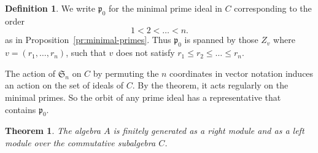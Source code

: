 \documentclass[12pt]{amsart}
\renewcommand{\le}{\leqslant}
\newcommand{\sym}[1]{\mathfrak{S}_{#1}}
\newcommand{\mfp}{\mathfrak{p}}
\numberwithin{equation}{section}
\newtheorem{theorem}[equation]{Theorem}
\theoremstyle{definition}
\newtheorem{definition}[equation]{Definition}
\begin{document}
\begin{definition}\label{def:p0}
We write $\mfp_0$ for the minimal prime ideal in $C$ corresponding to the order 
\[ 1<2<\dots<n. \] 
as in Proposition~\ref{pr:minimal-primes}. Thus $\mfp_0$ is spanned by
those $Z_v$ where $v=(r_1,\dots,r_n)$, such that $v$ does not
satisfy $r_1\le r_2\le \dots \le r_n$.
\end{definition}

The action of 
$\sym{n}$ on $C$ by permuting the $n$ coordinates in vector
notation induces 
an action on the set of ideals of $C$. By the theorem,
it acts regularly on the minimal primes. So the orbit of any
prime ideal has a representative that contains $\mfp_0$.


\begin{theorem}\label{th:fg}
The algebra $A$ is finitely generated as a right module and as a left
module over the commutative 
subalgebra $C$.
\end{theorem}
\end{document}
